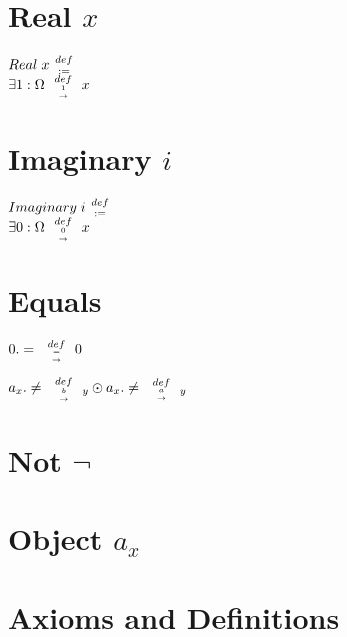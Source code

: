 \documentclass[11pt]{article}
\newcommand{\relationdef}[1]{ \hspace{2mm} { def \atop {#1 \atop \rightarrow }  } \hspace{2mm}}
\newcommand{\conditiondef}{ { \hspace{1mm}  {def \atop :=} \hspace{1mm} } }
\def \eitheror{\odot}
\begin{document}
\section{Real $x$}
\begin{center}
$
Real \hspace{1mm} x \conditiondef
$
\\ \vspace{2mm}
$
\exists 1 : \Omega \relationdef{1} x
$
\end{center}


\section{Imaginary $i$}
\begin{center}
$
Imaginary \hspace{1mm} i \conditiondef
$
\\ \vspace{2mm}
$
\exists 0 : \Omega \relationdef{0} x
$
\end{center}


\section{Equals}
\begin{center}
$
0.=\relationdef{=} 0
$
\end{center}
\begin{center}
$
a_x.\neq \relationdef b_y \eitheror a_x.\neq \relationdef a_y
$
\end{center}


\section{Not $\lnot$}
\begin{center}
\end{center}














\section{Object $a_x$}
\section{Axioms and Definitions}
\end{document}
